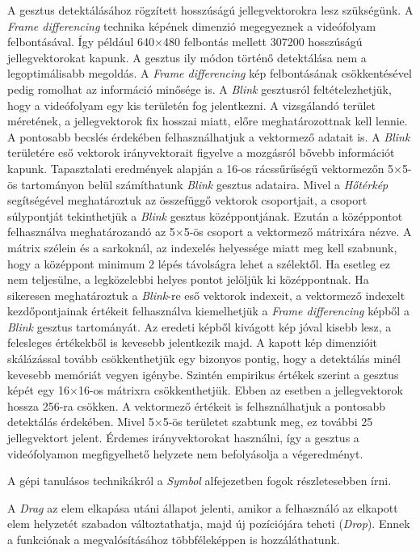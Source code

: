 A gesztus detektálásához rögzített hosszúságú jellegvektorokra lesz szükségünk. A \textit{Frame differencing} technika képének dimenzió megegyeznek a videófolyam felbontásával. Így például 640$\times$480 felbontás mellett 307200 hosszúságú jellegvektorokat kapunk. A gesztus ily módon történő detektálása nem a legoptimálisabb megoldás. A \textit{Frame differencing} kép felbontásának csökkentésével pedig romolhat az információ minősége is.
A \textit{Blink} gesztusról feltételezhetjük, hogy a videófolyam egy kis területén fog jelentkezni. A vizsgálandó terület méretének, a jellegvektorok fix hosszai miatt, előre meghatározottnak kell lennie. A pontosabb becslés érdekében felhasználhatjuk a vektormező adatait is. A \textit{Blink} területére eső vektorok irányvektorait figyelve a mozgásról bővebb információt kapunk. Tapasztalati eredmények alapján a 16-os rácssűrűségű vektormezőn 5$\times$5-ös tartományon belül számíthatunk \textit{Blink} gesztus adataira. Mivel a \textit{Hőtérkép} segítségével meghatároztuk az összefüggő vektorok csoportjait, a csoport súlypontját tekinthetjük a \textit{Blink} gesztus középpontjának. Ezután a középpontot felhasználva meghatározandó az 5$\times$5-ös csoport a vektormező mátrixára nézve. A mátrix szélein és a sarkoknál, az indexelés helyessége miatt meg kell szabnunk, hogy a középpont minimum 2 lépés távolságra lehet a szélektől. Ha esetleg ez nem teljesülne, a legközelebbi helyes pontot jelöljük ki középpontnak. Ha sikeresen meghatároztuk a \textit{Blink}-re eső vektorok indexeit, a vektormező indexelt kezdőpontjainak értékeit felhasználva kiemelhetjük a \textit{Frame differencing} képből a \textit{Blink} gesztus tartományát. Az eredeti képből kivágott kép jóval kisebb lesz, a felesleges értékekből is kevesebb jelentkezik majd.
A kapott kép dimenzióit skálázással tovább csökkenthetjük egy bizonyos pontig, hogy a detektálás minél kevesebb memóriát vegyen igénybe. Szintén empirikus értékek szerint a gesztus képét egy 16$\times$16-os mátrixra csökkenthetjük. Ebben az esetben a jellegvektorok hossza 256-ra csökken. A vektormező értékeit is felhsználhatjuk a pontosabb detektálás érdekében. Mivel 5$\times$5-ös területet szabtunk meg, ez további 25 jellegvektort jelent. Érdemes irányvektorokat használni, így a gesztus a videófolyamon megfigyelhető helyzete nem befolyásolja a végeredményt.

A gépi tanulásos technikákról a \textit{Symbol} alfejezetben fogok részletesebben írni.


A \textit{Drag} az elem elkapása utáni állapot jelenti, amikor a felhasználó az elkapott elem helyzetét szabadon változtathatja, majd új pozíciójára teheti (\textit{Drop}). Ennek a funkciónak a megvalósításához többféleképpen is hozzáláthatunk.


